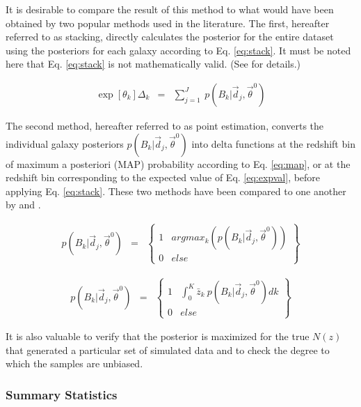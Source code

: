 \documentclass[preprint]{aastex}
\begin{document}
It is desirable to compare the result of this method to what would have been obtained by two popular methods used in the literature.   The first, hereafter referred to as stacking, directly calculates the posterior for the entire dataset using the posteriors for each galaxy according to Eq. \ref{eq:stack}.  \citep{lim08}  It must be noted here that Eq. \ref{eq:stack} is not mathematically valid.  (See \citet{hog12} for details.)  

\begin{eqnarray}
\label{eq:stack}
\exp[\theta_{k}]\Delta_{k} &=& \sum_{j=1}^{J}\ p(B_{k}|\vec{d}_{j},\vec{\theta}^{0})
\end{eqnarray}

The second method, hereafter referred to as point estimation, converts the individual galaxy posteriors $p(B_{k}|\vec{d}_{j},\vec{\theta}^{0})$ into delta functions at the redshift bin of maximum a posteriori (MAP) probability according to Eq. \ref{eq:map}, or at the redshift bin corresponding to the expected value of Eq. \ref{eq:expval}, before applying Eq. \ref{eq:stack}.  These two methods have been compared to one another by \citet{hil11} and \citet{ben12}.

\begin{eqnarray}
\label{eq:map}
p(B_{k}|\vec{d}_{j},\vec{\theta}^{0}) &=& \left\{\begin{array}{cc}1&argmax_{k}(p(B_{k}|\vec{d}_{j},\vec{\theta}^{0}))\\0&else\end{array}\right\}
\end{eqnarray}

\begin{eqnarray}
\label{eq:expval}
p(B_{k}|\vec{d}_{j},\vec{\theta}^{0}) &=& \left\{\begin{array}{cc}1&\int_{0}^{K} \bar{z}_{k}\ p(B_{k}|\vec{d}_{j},\vec{\theta}^{0}) dk\\0&else\end{array}\right\}
\end{eqnarray}

It is also valuable to verify that the posterior is maximized for the true $N(z)$ that generated a particular set of simulated data and to check the degree to which the samples are unbiased.

\clearpage
\subsubsection{Summary Statistics}
\label{sec:stats}
\end{document}
